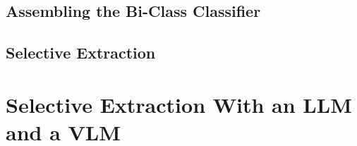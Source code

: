 \subsection{Assembling the Bi-Class Classifier}
\label{bi-class assemble}

\subsection{Selective Extraction}
\label{cnn selective extraction}

\section{Selective Extraction With an LLM and a VLM}
\label{llm and vlm extraction}